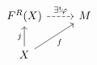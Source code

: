 \documentclass{article}
\begin{document}
    \begin{equation*}
        \begin{tikzcd}
            F^R\!\l(X\r) \ar[r, "\ex!\phi", dashed] & M \\
            X \ar[u, "j"] \ar[ur, "f"']
        \end{tikzcd}
    \end{equation*}
\end{document}
